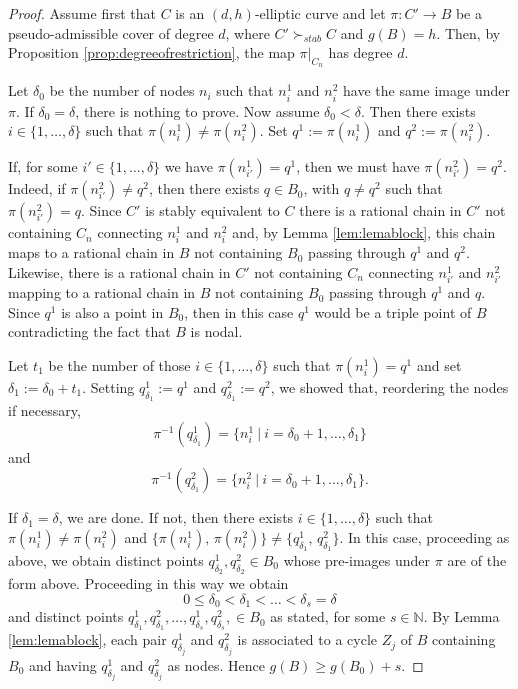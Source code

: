\documentclass{article}
\newcommand{\steq}{\succ_{stab}}
\renewcommand{\:}{\colon }
\begin{document}
\begin{proof}
Assume first that $C$ is an $(d,h)$-elliptic curve and let $\pi\:C'\rightarrow B$ be a pseudo-admissible cover of degree $d$, where $C'\steq C$ and $g(B)=h$. 
Then, by Proposition \ref{prop:degreeofrestriction},  the map $\pi|_{C_n}$ has degree $d$.


Let $\delta_0$ be the number of nodes $n_i$ such that $n_i^1$ and $n_i^2$ have the same image under $\pi$. 
If $\delta_0=\delta$, there is nothing to prove. 
Now assume $\delta_0<\delta$. 
Then there exists $i\in \{1, \ldots, \delta\}$ such that 
$\pi(n_i^1)\neq \pi(n_i^2)$. 
Set $q^1:= \pi(n_i^1) $ and $q^2:= \pi(n_i^2) $.


If, for some $i' \in \{1, \ldots, \delta\}$ we have $\pi(n_{{i}'}^1)= q^1$, then we must have $\pi(n_{{i}'}^2)= q^2$. 
Indeed, if $\pi(n_{{i}'}^2) \neq q^2$, then there exists $q \in B_0$, with $q\neq q^2$  such that $\pi(n_{{i}'}^2)= q$. 
Since $C'$ is stably equivalent to $C$  
there is a rational chain in $C'$ not containing $C_n$ connecting $n_i^1$ and $n_i^2$ and,
by Lemma \ref{lem:lemablock}, 
this chain maps
to a rational chain in $B$ not containing $B_0$ passing through $q^1$ and $q^2$.
Likewise, 
there is a rational chain in $C'$ not containing $C_n$ connecting $n_{i'}^1$ and $n_{i'}^2$ mapping 
to a rational chain in $B$ not containing $B_0$ passing through $q^1$ and $q$.
Since $q^1$ is also a point in $B_0$, then in this case $q^1$ would be a triple point of $B$ contradicting the fact that $B$ is nodal.



Let $t_1$ be the number of those $i\in\{1,\ldots,\delta\}$ such that $\pi(n_i^1)=q^1$ 
and set $\delta_1:=\delta_0+t_1$. 
Setting $q_{\delta_1}^1:=q^1$ and  $q_{\delta_1}^2:=q^2$, 
we showed that, reordering the nodes if necessary, 
$$\pi^{-1}(q^1_{\delta_1})= \{ n_{{i}}^1 \ | \ i=\delta_0+1, \ldots, \delta_1\}$$
and
$$\pi^{-1}(q^2_{\delta_1})= \{ n_{i}^2 \ | \  i=\delta_0+1, \ldots, \delta_1\}.$$

If $\delta_1=\delta$, we are done. If not, then there exists $i\in\{1,\ldots,\delta\}$ such that
$\pi(n_i^1)\neq \pi(n_i^2)$ and $\{\pi(n_i^1),\,\pi(n_i^2)\}\neq \{q_{\delta_1}^1,\,q_{\delta_1}^2\}$. In this case, proceeding as above, we obtain distinct points $q_{\delta_2}^1,q_{\delta_2}^2\in B_0$ whose pre-images under $\pi$ are of the form  above.
Proceeding in this way we obtain
$$0\leq \delta_0< \delta_1< \ldots < \delta_s = \delta$$
and distinct points $q_{\delta_1}^1,q_{\delta_1}^2,\ldots,q_{\delta_s}^1,q_{\delta_s}^2,\in B_0$
as stated, for some $s\in\mathbb N$. 
By Lemma \ref{lem:lemablock}, each pair $q_{\delta_j}^1$ and $q_{\delta_j}^2$ is associated to a cycle $Z_j$ of $B$ containing $B_0$ and having $q_{\delta_j}^1$ and $q_{\delta_j}^2$  as nodes. 
Hence
$g(B)\geq g(B_0)+s$.


\end{proof}
\end{document}
